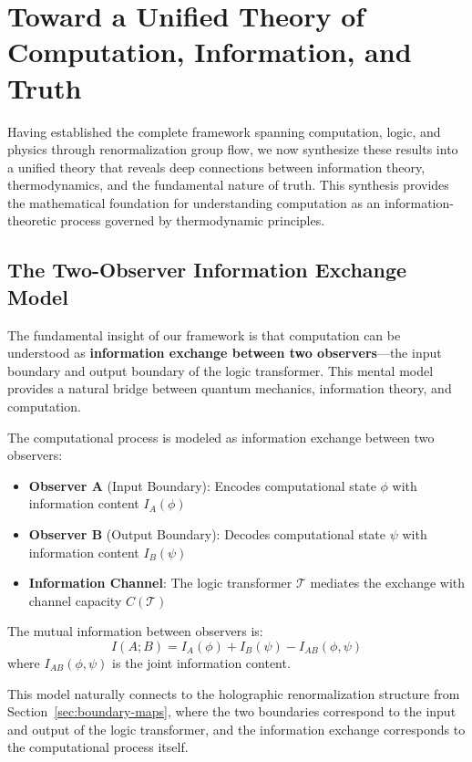 \section{Toward a Unified Theory of Computation, Information, and Truth}
\label{sec:unified-theory}

Having established the complete framework spanning computation, logic, and physics through renormalization group flow, we now synthesize these results into a unified theory that reveals deep connections between information theory, thermodynamics, and the fundamental nature of truth. This synthesis provides the mathematical foundation for understanding computation as an information-theoretic process governed by thermodynamic principles.

\subsection{The Two-Observer Information Exchange Model}

The fundamental insight of our framework is that computation can be understood as \textbf{information exchange between two observers}—the input boundary and output boundary of the logic transformer. This mental model provides a natural bridge between quantum mechanics, information theory, and computation.

\begin{definition}
\label{def:two-observer-exchange}
The computational process is modeled as information exchange between two observers:
\begin{itemize}
\item \textbf{Observer A} (Input Boundary): Encodes computational state $\phi$ with information content $I_A(\phi)$
\item \textbf{Observer B} (Output Boundary): Decodes computational state $\psi$ with information content $I_B(\psi)$
\item \textbf{Information Channel}: The logic transformer $\mathcal{T}$ mediates the exchange with channel capacity $C(\mathcal{T})$
\end{itemize}
The mutual information between observers is:
\[
I(A;B) = I_A(\phi) + I_B(\psi) - I_{AB}(\phi,\psi)
\]
where $I_{AB}(\phi,\psi)$ is the joint information content.
\end{definition}

This model naturally connects to the holographic renormalization structure from Section~\ref{sec:boundary-maps}, where the two boundaries correspond to the input and output of the logic transformer, and the information exchange corresponds to the computational process itself.

